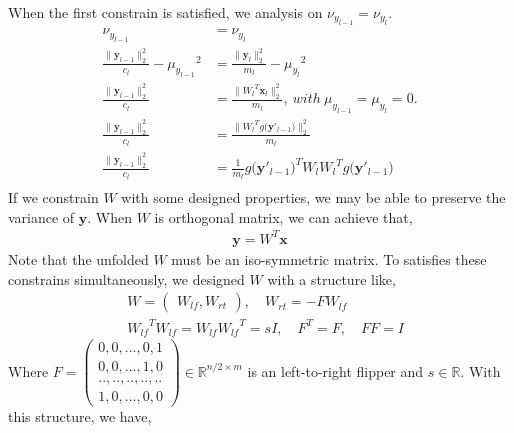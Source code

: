 \documentclass[]{article}
\newtheorem{lemma}{Lemma}
\begin{document}
When the first constrain is satisfied, we analysis on $\nu_{y_{l-1}}=\nu_{y_{l}}$.
\begin{align}\label{constrain2}
\nu_{y_{l-1}}&=\nu_{y_{l}}  \\
\frac{\|\mathbf{y}_{l-1}\|^{2}_{2}}{c_l}-{\mu_{{y}_{l-1}}}^2&=\frac{\|\mathbf{y}_{l}\|^{2}_{2}}{m_l}-{\mu_{y_{l}}}^2 \\
\frac{\|\mathbf{y}_{l-1}\|^{2}_{2}}{c_l}&=\frac{\|{W_l}^{T}\mathbf{x}_{l}\|^{2}_{2}}{m_l},\ with\ \mu_{y_{l-1}}=\mu_{y_{l}}=0.\\
\frac{\|\mathbf{y}_{l-1}\|^{2}_{2}}{c_l}&=\frac{\|{W_l}^{T}g\big(\mathbf{y}'_{l-1}\big)\|^{2}_{2}}{m_l} \\
\frac{\|\mathbf{y}_{l-1}\|^{2}_{2}}{c_l}&=\frac{1}{m_l}{g\big(\mathbf{y}'_{l-1}\big)}^{T}{W_l}{W_l}^{T}g\big(\mathbf{y}'_{l-1}\big) \\
\end{align}
If we constrain $W$ with some designed properties, we may be able to preserve the variance of $\mathbf{y}$. When $W$ is orthogonal matrix, we can achieve that,
\begin{align}
\mathbf{y} = W^{T}\mathbf{x}
\end{align}
Note that the unfolded $W$ must be an iso-symmetric matrix. To satisfies these constrains simultaneously, we designed $W$ with a structure like,
\begin{align}
&W = \begin{pmatrix} W_{lf},  W_{rt} \end{pmatrix}, \quad  W_{rt}=-FW_{lf} \\
&{W_{lf}}^{T}{W_{lf}}={W_{lf}}{W_{lf}}^{T}=sI, \quad F^{T}=F, \quad FF=I
\end{align}
Where $F=\begin{pmatrix} 0,0, ... ,0,1 \\ 0,0, ...,1,0 \\ ..,..,..,..,.. \\ 1,0, ... ,0,0 \end{pmatrix}\in\mathbb{R}^{n/2 \times m}$ is an left-to-right flipper and $s\in\mathbb{R}$. With this structure, we have,
\end{document}
